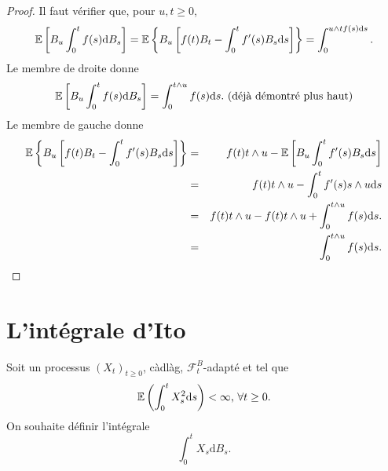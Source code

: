 \begin{proof}
Il faut vérifier que, pour $u, t\geq 0$, 
\begin{equation}\label{eq:identity_wiener_integral}
\mathbb{E}\left[B_u\int_0^tf(s)\text{d}B_s\right] = \mathbb{E}\left\{B_u\left[f(t)B_t - \int_0^tf'(s)B_s\text{d}s\right]\right\} = \int_0^{u\land tf(s)\text{d}s}.
\end{equation}
Le membre de droite donne
$$
\mathbb{E}\left[B_u\int_0^tf(s)\text{d}B_s\right] = \int_0^{t\land u}f(s)\text{d}s.\text{ (déjà démontré plus haut)}
$$
Le membre de gauche donne
\begin{eqnarray*}
\mathbb{E}\left\{B_u\left[f(t)B_t - \int_0^tf'(s)B_s\text{d}s\right]\right\}&=&f(t) t\land u - \mathbb{E}\left[B_u\int_0^tf'(s)B_s\text{d}s\right]\\
&=&f(t) t\land u - \int_0^tf'(s)s\land u\text{d}s\\
&=& f(t) t\land u - f(t) t\land u + \int_0^{t\land u}f(s)\text{d}s.\\
&=&  \int_0^{t\land u}f(s)\text{d}s.
\end{eqnarray*}
\end{proof}

\section{L'intégrale d'Ito}\label{sec:ito_integral}
Soit un processus $(X_t)_{t\geq 0}$, càdlàg, $\mathcal{F}^B_t$-adapté et tel que 
$$
\mathbb{E}\left(\int_0^t X_s^2\text{d}s\right)<\infty\text{,  }\forall t\geq 0.
$$
On souhaite définir l'intégrale 
$$
\int_0^t X_s\text{d}B_s.
$$

